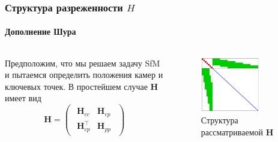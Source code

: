 \documentclass[notheorems,aspectratio=169]{beamer}
\begin{document}
\begin{frame}
  \frametitle{Структура разреженности $H$}
  \framesubtitle{Дополнение Шура}
  \begin{columns}
    \begin{column}{0.5\textwidth}
      Предположим, что мы решаем задачу SfM и пытаемся определить положения камер и ключевых точек. В простейшем случае $\mathbf{H}$ имеет вид
      $$
      \mathbf{H}=
      \begin{pmatrix}
        \begin{array}{c|c}
          \mathbf{H}_{cc} & \mathbf{H}_{cp} \\
          \hline
          \mathbf{H}_{cp}^\intercal & \mathbf{H}_{pp}
        \end{array}
      \end{pmatrix}
      $$

    \end{column}
    \begin{column}{0.5\textwidth}
      \begin{figure}
        \includegraphics[width=0.7\textwidth]{h-struct-easy}
        \caption*{Структура рассматриваемой $\mathbf{H}$}
      \end{figure}
    \end{column}
  \end{columns}
\end{frame}
\end{document}
